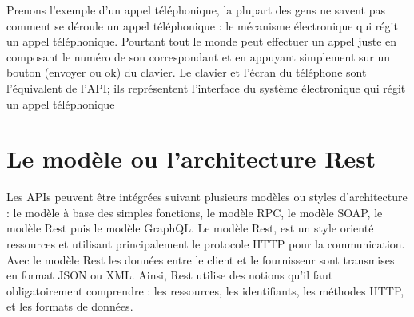 Prenons l’exemple d’un appel téléphonique, la plupart des gens ne savent pas comment se déroule un appel
téléphonique : le mécanisme électronique qui régit un appel téléphonique. Pourtant tout le monde peut
effectuer un appel juste en composant le numéro de son correspondant et en appuyant simplement sur
un bouton (envoyer ou ok) du clavier. Le clavier et l’écran du téléphone sont l’équivalent de l’API; ils
représentent l’interface du système électronique qui régit un appel téléphonique

\section{Le modèle ou l'architecture Rest}
Les APIs peuvent être intégrées suivant plusieurs modèles ou styles d’architecture : le modèle à base des
simples fonctions, le modèle RPC, le modèle SOAP, le modèle Rest puis le modèle GraphQL.
Le modèle Rest, est un style orienté ressources et utilisant principalement le protocole HTTP pour la communication. Avec le modèle Rest les données entre le client et le fournisseur sont transmises en format JSON ou
XML. Ainsi, Rest utilise des notions qu’il faut obligatoirement comprendre : les ressources, les identifiants, les méthodes HTTP, et les formats de données.
